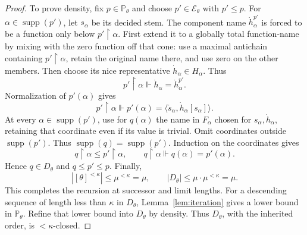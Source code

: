 \documentclass[11pt,a4paper]{amsart}
\theoremstyle{definition}
\theoremstyle{remark}
\newcommand{\PP}{\mathbb P}
\DeclareMathOperator{\supp}{supp}
\begin{document}
\begin{proof}
To prove density, fix \(p\in\PP_\theta\) and choose
\(p'\in\mathcal E_\theta\) with \(p'\leq p\).
For \(\alpha\in\supp(p')\), let \(s_\alpha\) be its
decided stem. The component name \(\dot h_\alpha^{p'}\)
is forced to be a function only below
\(p'\restriction\alpha\). First extend it to a globally
total function-name by mixing with the zero function off
that cone: use a maximal antichain containing
\(p'\restriction\alpha\), retain the original name there,
and use zero on the other members. Then choose its nice
representative \(\dot h_\alpha\in H_\alpha\). Thus
\[
 p'\restriction\alpha\Vdash
                         \dot h_\alpha=\dot h_\alpha^{p'}.
\]
Normalization of \(p'(\alpha)\) gives
\[
 p'\restriction\alpha\Vdash
 p'(\alpha)=\langle\check s_\alpha,\dot h_\alpha[s_\alpha]\rangle.
\]
At every \(\alpha\in\supp(p')\), use for \(q(\alpha)\)
the name in \(F_\alpha\) chosen for
\(s_\alpha,\dot h_\alpha\), retaining that coordinate
even if its value is trivial. Omit coordinates outside
\(\supp(p')\). Thus \(\supp(q)=\supp(p')\).
Induction on the coordinates gives
\[
 q\restriction\alpha\leq p'\restriction\alpha,
 \qquad q\restriction\alpha\Vdash q(\alpha)=p'(\alpha).
\]
Hence \(q\in D_\theta\) and \(q\leq p'\leq p\).
Finally,
\[
 |[\theta]^{<\kappa}|\leq\mu^{<\kappa}=\mu,
 \qquad |D_\theta|\leq\mu\cdot\mu^{<\kappa}=\mu.
\]
This completes the recursion at successor and limit lengths.
For a descending sequence of length less than \(\kappa\) in
\(D_\theta\), Lemma~\ref{lem:iteration} gives a lower bound
in \(\PP_\theta\). Refine that lower bound into \(D_\theta\)
by density. Thus \(D_\theta\), with the inherited order, is
\(<\kappa\)-closed.
\end{proof}
\end{document}
